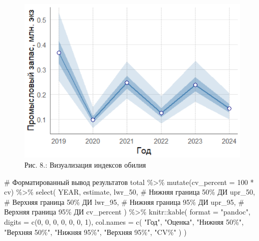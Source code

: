 \documentclass[
  letterpaper,
  DIV=11,
  numbers=noendperiod]{scrreprt}
\newenvironment{Shaded}{\begin{snugshade}}{\end{snugshade}}
\newcommand{\AttributeTok}[1]{\textcolor[rgb]{0.40,0.45,0.13}{#1}}
\newcommand{\CommentTok}[1]{\textcolor[rgb]{0.37,0.37,0.37}{#1}}
\newcommand{\DecValTok}[1]{\textcolor[rgb]{0.68,0.00,0.00}{#1}}
\newcommand{\FunctionTok}[1]{\textcolor[rgb]{0.28,0.35,0.67}{#1}}
\newcommand{\NormalTok}[1]{\textcolor[rgb]{0.00,0.23,0.31}{#1}}
\newcommand{\SpecialCharTok}[1]{\textcolor[rgb]{0.37,0.37,0.37}{#1}}
\newcommand{\StringTok}[1]{\textcolor[rgb]{0.13,0.47,0.30}{#1}}
\begin{document}
\begin{figure}[H]

{\centering \includegraphics[width=0.6\linewidth,height=\textheight,keepaspectratio]{images/sdmTMB7.PNG}

}

\caption{Рис. 8.: Визуализация индексов обилия}

\end{figure}%

\begin{Shaded}
\begin{Highlighting}[]
\CommentTok{\# Форматированный вывод результатов}
\NormalTok{total }\SpecialCharTok{\%\textgreater{}\%} 
  \FunctionTok{mutate}\NormalTok{(}\AttributeTok{cv\_percent =} \DecValTok{100} \SpecialCharTok{*}\NormalTok{ cv) }\SpecialCharTok{\%\textgreater{}\%} 
  \FunctionTok{select}\NormalTok{(}
\NormalTok{    YEAR, }
\NormalTok{    estimate, }
\NormalTok{    lwr\_50,  }\CommentTok{\# Нижняя граница 50\% ДИ}
\NormalTok{    upr\_50,  }\CommentTok{\# Верхняя граница 50\% ДИ}
\NormalTok{    lwr\_95,  }\CommentTok{\# Нижняя граница 95\% ДИ}
\NormalTok{    upr\_95,  }\CommentTok{\# Верхняя граница 95\% ДИ}
\NormalTok{    cv\_percent}
\NormalTok{  ) }\SpecialCharTok{\%\textgreater{}\%}
\NormalTok{  knitr}\SpecialCharTok{::}\FunctionTok{kable}\NormalTok{(}
    \AttributeTok{format =} \StringTok{"pandoc"}\NormalTok{, }
    \AttributeTok{digits =} \FunctionTok{c}\NormalTok{(}\DecValTok{0}\NormalTok{, }\DecValTok{0}\NormalTok{, }\DecValTok{0}\NormalTok{, }\DecValTok{0}\NormalTok{, }\DecValTok{0}\NormalTok{, }\DecValTok{0}\NormalTok{, }\DecValTok{1}\NormalTok{),}
    \AttributeTok{col.names =} \FunctionTok{c}\NormalTok{(}
      \StringTok{"Год"}\NormalTok{, }
      \StringTok{"Оценка"}\NormalTok{, }
      \StringTok{"Нижняя 50\%"}\NormalTok{, }
      \StringTok{"Верхняя 50\%"}\NormalTok{, }
      \StringTok{"Нижняя 95\%"}\NormalTok{, }
      \StringTok{"Верхняя 95\%"}\NormalTok{, }
      \StringTok{"CV\%"}
\NormalTok{    )}
\NormalTok{  )}
\end{Highlighting}
\end{Shaded}
\end{document}
